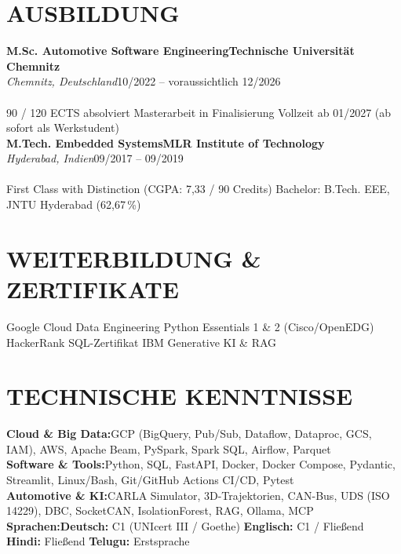 \documentclass[9.6pt,a4paper]{article}
\newcommand{\educationitem}[4]{%
  \textbf{#1}\hfill\textbf{#2}\\[-0.03em]
  {\small\textit{#3}}\hfill{\small #4}\\[0.10em]
}
\newcommand{\skillrow}[2]{\textbf{#1:}\enspace #2\\[-0.03em]}
\begin{document}
\section{AUSBILDUNG}

\educationitem{M.Sc. Automotive Software Engineering}{Technische Universität Chemnitz}{Chemnitz, Deutschland}{10/2022 -- voraussichtlich 12/2026}\\
{\small 90 / 120 ECTS absolviert \enspace\textbar\enspace Masterarbeit in Finalisierung \enspace\textbar\enspace Vollzeit ab 01/2027 (ab sofort als Werkstudent)}\\[0.02em]
\educationitem{M.Tech. Embedded Systems}{MLR Institute of Technology}{Hyderabad, Indien}{09/2017 -- 09/2019}\\
{\small First Class with Distinction (CGPA: 7,33 / 90 Credits) \enspace\textbar\enspace Bachelor: B.Tech. EEE, JNTU Hyderabad (62,67\,\%)}

\section{WEITERBILDUNG \& ZERTIFIKATE}
{\small
\textbullet\enspace Google Cloud Data Engineering \enspace\textbullet\enspace Python Essentials 1 \& 2 (Cisco/OpenEDG) \enspace\textbullet\enspace HackerRank SQL-Zertifikat \enspace\textbullet\enspace IBM Generative KI \& RAG
}

\section{TECHNISCHE KENNTNISSE}
{\small
\skillrow{Cloud \& Big Data}{GCP (BigQuery, Pub/Sub, Dataflow, Dataproc, GCS, IAM), AWS, Apache Beam, PySpark, Spark SQL, Airflow, Parquet}
\skillrow{Software \& Tools}{Python, SQL, FastAPI, Docker, Docker Compose, Pydantic, Streamlit, Linux/Bash, Git/GitHub Actions CI/CD, Pytest}
\skillrow{Automotive \& KI}{CARLA Simulator, 3D-Trajektorien, CAN-Bus, UDS (ISO 14229), DBC, SocketCAN, IsolationForest, RAG, Ollama, MCP}
\skillrow{Sprachen}{\textbf{Deutsch:} C1 (UNIcert III / Goethe) \enspace\textbar\enspace \textbf{Englisch:} C1 / Fließend \enspace\textbar\enspace \textbf{Hindi:} Fließend \enspace\textbar\enspace \textbf{Telugu:} Erstsprache}
}
\end{document}
